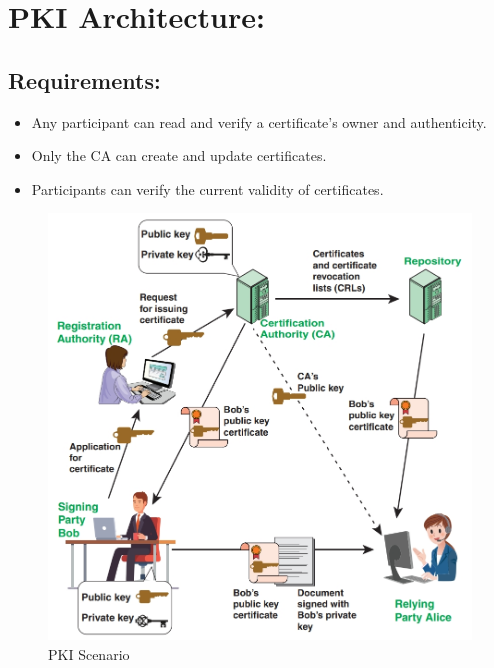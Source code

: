 \section{PKI Architecture:}

\subsection{Requirements:}
\begin{itemize}
    \item Any participant can read and verify a certificate’s owner and authenticity.
    \item Only the CA can create and update certificates.
    \item Participants can verify the current validity of certificates.
\end{itemize}
\begin{figure}
    \centering
    \includegraphics[width=1\linewidth]{Data_Privacy_and_Cryptography/Figures/PKI Scenario.jpeg}
    \caption{PKI Scenario}
    \label{fig:pkiscenario}
\end{figure}
